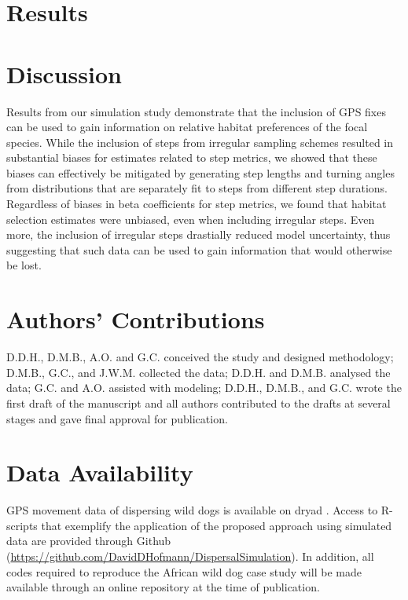 \documentclass[abstract=on,10pt,a4paper,bibliography=totocnumbered]{article}
\begin{document}
\section{Results}
\section{Discussion}
Results from our simulation study demonstrate that the inclusion of GPS fixes
can be used to gain information on relative habitat preferences of the focal
species. While the inclusion of steps from irregular sampling schemes resulted
in substantial biases for estimates related to step metrics, we showed that
these biases can effectively be mitigated by generating step lengths and turning
angles from distributions that are separately fit to steps from different step
durations. Regardless of biases in beta coefficients for step metrics, we found
that habitat selection estimates were unbiased, even when including irregular
steps. Even more, the inclusion of irregular steps drastially reduced model
uncertainty, thus suggesting that such data can be used to gain information that
would otherwise be lost.

\section{Authors' Contributions}
D.D.H., D.M.B., A.O. and G.C. conceived the study and designed methodology;
D.M.B., G.C., and J.W.M. collected the data; D.D.H. and D.M.B. analysed the
data; G.C. and A.O. assisted with modeling; D.D.H., D.M.B., and G.C. wrote the
first draft of the manuscript and all authors contributed to the drafts at
several stages and gave final approval for publication.

\section{Data Availability}
GPS movement data of dispersing wild dogs is available on dryad
\citep{Hofmann.2021b}. Access to R-scripts that exemplify the application of the
proposed approach using simulated data are provided through Github
(\url{https://github.com/DavidDHofmann/DispersalSimulation}). In addition, all
codes required to reproduce the African wild dog case study will be made
available through an online repository at the time of publication.
\end{document}
